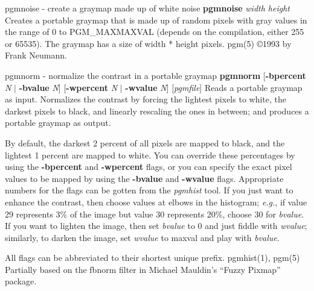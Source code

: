 pgmnoise - create a graymap made up of white noise
{\bf pgmnoise}
{\it width height}
Creates a portable graymap that is made up of random pixels with
gray values in the range of 0 to PGM\_MAXMAXVAL (depends on the compilation,
either 255 or 65535). The graymap has a size of width * height pixels.
pgm(5)
\copyright 1993 by Frank Neumann.
%

%

\newpage
%

pgmnorm - normalize the contrast in a portable graymap
{\bf pgmnorm}
{\rm [}{\bf -bpercent}
{\it N}
$|$
{\bf -bvalue}
{\it N}{\rm ]}
{\rm [}{\bf -wpercent}
{\it N}
$|$
{\bf -wvalue}
{\it N}{\rm ]}
{\rm [}{\it pgmfile}{\rm ]}
Reads a portable graymap as input.
Normalizes the contrast by forcing the lightest pixels to white, the
darkest pixels to black, and linearly rescaling the ones in between;
and produces a portable graymap as output.
\par
By default, the darkest 2 percent of all pixels are mapped to black, and
the lightest 1 percent are mapped to white.
You can override these percentages by using the
{\bf -bpercent}
and
{\bf -wpercent}
flags,
or you can specify the exact pixel values to be mapped by using the
{\bf -bvalue}
and
{\bf -wvalue}
flags.
Appropriate numbers for the flags can be gotten from the
{\it pgmhist}
tool.
If you just want to enhance the contrast, then choose values at elbows in the
histogram; {\it e.g.}, if value 29 represents 3\% of the image but value 30
represents 20\%, choose 30 for
{\it bvalue}{\rm .}
If you want to lighten the
image, then set
{\it bvalue}
to 0 and just fiddle with
{\it wvalue}{\rm ;}
similarly, to darken the image, set
{\it wvalue}
to maxval and play with
{\it bvalue}{\rm .}
\par
All flags can be abbreviated to their shortest unique prefix.
pgmhist(1), pgm(5)
Partially based on the fbnorm filter in Michael Mauldin's ``Fuzzy
Pixmap''
package.

